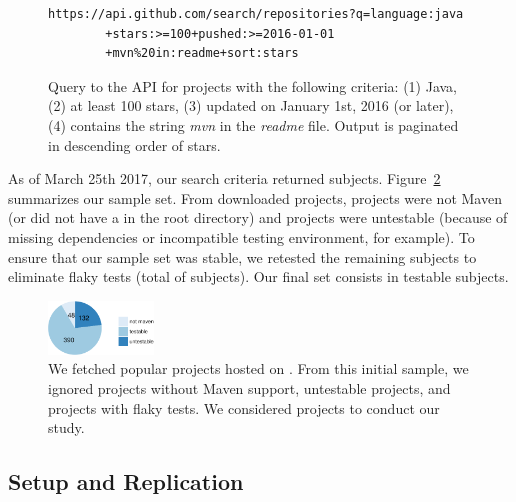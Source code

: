 \vspace{1ex}
\begin{figure}[h!]
\centering
\scriptsize
{}
\begin{lstlisting}
https://api.github.com/search/repositories?q=language:java
        +stars:>=100+pushed:>=2016-01-01
        +mvn%20in:readme+sort:stars
\end{lstlisting}
    \caption{\label{fig:subject-query} Query to the \github{} API for
    projects with the following criteria: (1) Java, (2) at least 100
    stars, (3) updated on January 1st, 2016 (or later), (4) contains
    the string \emph{mvn} in the \emph{readme} file. Output is
    paginated in descending order of stars.}
\end{figure}

As of March 25th 2017, our search criteria returned \SubjectsGithub{}
subjects. Figure~\ref{fig:subjects} summarizes our sample set. From
\SubjectsGithub{} downloaded projects, \SubjectsGithubNotMaven{}
projects were not Maven (or did not have a \pomf{} in the root
directory) and \SubjectsGithubNotTestable{} projects were untestable
(because of missing dependencies or incompatible testing environment,
for example). To ensure that our sample set was stable, we retested
the remaining subjects to eliminate flaky tests (total of
\SubjectsGithubFlaky{} subjects). Our final set consists in
\numSubjs{} testable subjects.

\begin{figure}[ht]
    \centering
    \includegraphics[width=0.25\textwidth]{plots/subjs.pdf}
    \caption{\label{fig:subjects}We fetched \SubjectsGithub{} popular
    projects hosted on \github{}. From this initial sample, we ignored
    \SubjectsGithubNotMaven{} projects without Maven support,
    \SubjectsGithubNotTestable{} untestable projects, and
    \SubjectsGithubFlaky{} projects with flaky tests. We considered
    \numSubjs{} projects to conduct our study.}
\end{figure}

\subsection{Setup and Replication}
\label{sec:setup}

